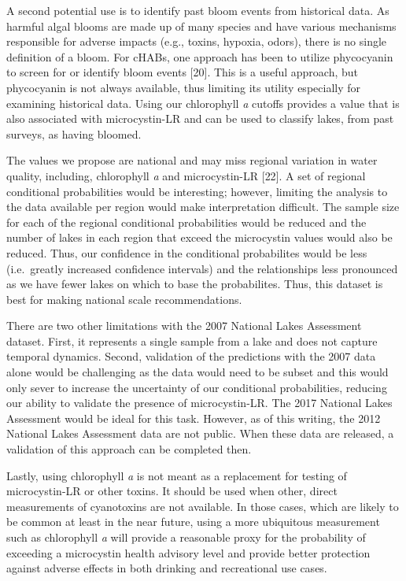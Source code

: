 \documentclass[11pt,]{article}
\begin{document}
A second potential use is to identify past bloom events from historical
data. As harmful algal blooms are made up of many species and have
various mechanisms responsible for adverse impacts (e.g., toxins,
hypoxia, odors), there is no single definition of a bloom. For cHABs,
one approach has been to utilize phycocyanin to screen for or identify
bloom events {[}20{]}. This is a useful approach, but phycocyanin is not
always available, thus limiting its utility especially for examining
historical data. Using our chlorophyll \emph{a} cutoffs provides a value
that is also associated with microcystin-LR and can be used to classify
lakes, from past surveys, as having bloomed.

The values we propose are national and may miss regional variation in
water quality, including, chlorophyll \emph{a} and microcystin-LR
{[}22{]}. A set of regional conditional probabilities would be
interesting; however, limiting the analysis to the data available per
region would make interpretation difficult. The sample size for each of
the regional conditional probabilities would be reduced and the number
of lakes in each region that exceed the microcystin values would also be
reduced. Thus, our confidence in the conditional probabilites would be
less (i.e.~greatly increased confidence intervals) and the relationships
less pronounced as we have fewer lakes on which to base the
probabilites. Thus, this dataset is best for making national scale
recommendations.

There are two other limitations with the 2007 National Lakes Assessment
dataset. First, it represents a single sample from a lake and does not
capture temporal dynamics. Second, validation of the predictions with
the 2007 data alone would be challenging as the data would need to be
subset and this would only sever to increase the uncertainty of our
conditional probabilities, reducing our ability to validate the presence
of microcystin-LR. The 2017 National Lakes Assessment would be ideal for
this task. However, as of this writing, the 2012 National Lakes
Assessment data are not public. When these data are released, a
validation of this approach can be completed then.

Lastly, using chlorophyll \emph{a} is not meant as a replacement for
testing of microcystin-LR or other toxins. It should be used when other,
direct measurements of cyanotoxins are not available. In those cases,
which are likely to be common at least in the near future, using a more
ubiquitous measurement such as chlorophyll \emph{a} will provide a
reasonable proxy for the probability of exceeding a microcystin health
advisory level and provide better protection against adverse effects in
both drinking and recreational use cases.
\end{document}
